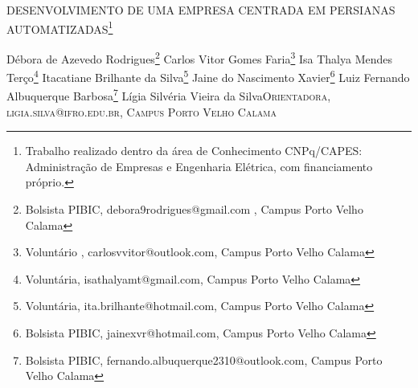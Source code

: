 \documentclass[article,12pt,onesidea,4paper,english,brazil]{abntex2}
\begin{document}
	
	
	\frenchspacing 
	
	\begin{center}
		\LARGE DESENVOLVIMENTO DE UMA EMPRESA CENTRADA EM PERSIANAS AUTOMATIZADAS\footnote{Trabalho realizado dentro da área de Conhecimento CNPq/CAPES: Administração de Empresas e Engenharia Elétrica, com financiamento próprio.}
		
		\normalsize
		Débora de Azevedo Rodrigues\footnote{Bolsista PIBIC, debora9rodrigues@gmail.com , Campus Porto Velho Calama} 
		Carlos Vitor Gomes Faria\footnote{Voluntário , carlosvvitor@outlook.com, Campus Porto Velho Calama} 
		Isa Thalya Mendes Terço\footnote{Voluntária, isathalyamt@gmail.com, Campus Porto Velho Calama} 
		Itacatiane Brilhante da Silva\footnote{Voluntária, ita.brilhante@hotmail.com, Campus Porto Velho Calama}
		Jaine do Nascimento Xavier\footnote{Bolsista PIBIC, jainexvr@hotmail.com, Campus Porto Velho Calama}
		Luiz Fernando Albuquerque Barbosa\footnote{Bolsista PIBIC, fernando.albuquerque2310@outlook.com, Campus Porto Velho Calama}
		Lígia Silvéria Vieira da Silva\textsc{Orientadora, ligia.silva@ifro.edu.br, Campus Porto Velho Calama}
	\end{center}
	
\end{document}
